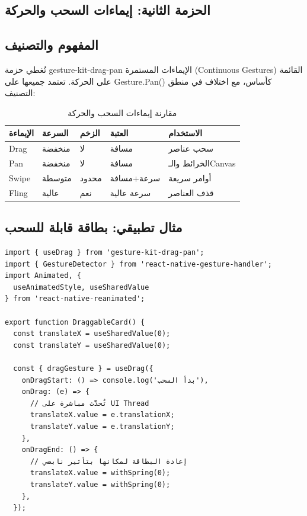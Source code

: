 \begin{Arabic}
\section{الحزمة الثانية: إيماءات السحب والحركة}

\subsection{المفهوم والتصنيف}

تُغطي حزمة \textenglish{gesture-kit-drag-pan} الإيماءات المستمرة (\textenglish{Continuous Gestures}) القائمة على الحركة. تعتمد جميعها على \textenglish{Gesture.Pan()} كأساس، مع اختلاف في منطق التصنيف:

\begin{table}[htbp]
\centering
\caption{مقارنة إيماءات السحب والحركة}
\label{tab:drag-compare}
\begin{tabularx}{\textwidth}{XXXXX}
\toprule
\textbf{الإيماءة} & \textbf{السرعة} & \textbf{الزخم} & \textbf{العتبة} & \textbf{الاستخدام} \\
\midrule
\textenglish{Drag} & منخفضة & لا & مسافة & سحب عناصر \\
\rowcolor{gray!10}
\textenglish{Pan} & منخفضة & لا & مسافة & الخرائط والـ\textenglish{Canvas} \\
\textenglish{Swipe} & متوسطة & محدود & سرعة+مسافة & أوامر سريعة \\
\rowcolor{gray!10}
\textenglish{Fling} & عالية & نعم & سرعة عالية & قذف العناصر \\
\bottomrule
\end{tabularx}
\end{table}

\subsection{مثال تطبيقي: بطاقة قابلة للسحب}

\begin{english}
\begin{verbatim}
import { useDrag } from 'gesture-kit-drag-pan';
import { GestureDetector } from 'react-native-gesture-handler';
import Animated, {
  useAnimatedStyle, useSharedValue
} from 'react-native-reanimated';

export function DraggableCard() {
  const translateX = useSharedValue(0);
  const translateY = useSharedValue(0);

  const { dragGesture } = useDrag({
    onDragStart: () => console.log('بدأ السحب'),
    onDrag: (e) => {
      // تُحدَّث مباشرة على UI Thread
      translateX.value = e.translationX;
      translateY.value = e.translationY;
    },
    onDragEnd: () => {
      // إعادة البطاقة لمكانها بتأثير نابضي
      translateX.value = withSpring(0);
      translateY.value = withSpring(0);
    },
  });


\end{verbatim}
\end{english}
\end{Arabic}
